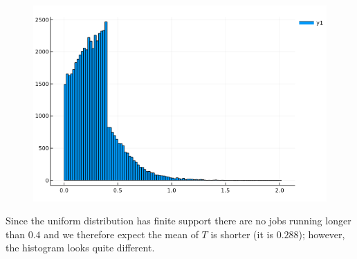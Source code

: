 \begin{figure}[hbt!]
\centering
\includegraphics[scale=0.5]{images/queuing_3_2.png}
\end{figure}

Since the uniform distribution has finite support there are no jobs running longer than $0.4$ and we therefore expect the mean of $T$ is shorter (it is $0.288$); however, the histogram looks quite different.



